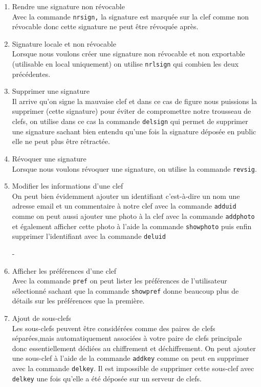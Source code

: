 \begin{enumerate}
\item Rendre une signature non révocable\\
Avec la commande \texttt{nrsign,} la signature est marquée sur la clef comme non révocable donc cette signature ne peut être 
révoquée après.

\item Signature locale et non révocable\\
Lorsque nous voulons créer une signature non révocable et non exportable (utilisable en local uniquement) on utilise \texttt{nrlsign}
 qui combien les deux précédentes.
\item Supprimer une signature\\
Il arrive qu'on signe la mauvaise clef et dans ce cas de figure nous puissions la supprimer (cette signature)  pour éviter de compromettre
 notre trousseau de clefs, on utilise dans ce cas la commande \texttt{delsign} qui permet de supprimer une signature sachant bien
 entendu qu'une fois la signature déposée en public elle ne peut plus être  rétractée.
\item Révoquer une signature\\
Lorsque nous voulons révoquer une signature, on utilise la commande \texttt{revsig}.
\item Modifier les informations d'une clef\\
On peut bien évidemment ajouter un identifiant c'est-à-dire un nom une adresse email et un commentaire à notre clef avec 
la commande \texttt{adduid} comme on peut aussi  ajouter une photo à la clef avec la commande \texttt{addphoto} et également afficher 
cette photo à l'aide la commande \texttt{showphoto} puis enfin supprimer l'identifiant avec la commande \texttt{deluid}

-\item Afficher les préférences d'une clef\\
Avec la commande \texttt{pref} on peut lister les préférences de l'utilisateur sélectionné sachant que la commande \texttt{showpref}
 donne beaucoup plus de détails sur les préférences que la première.
\item Ajout de sous-clefs\\
Les sous-clefs peuvent être considérées comme des paires de clefs séparées,mais automatiquement associées à votre paire de clefs 
principale donc essentiellement dédiées au chiffrement et déchiffrement.
On peut ajouter une sous-clef à l'aide de la commande \texttt{addkey} comme on peut en supprimer avec la commande \texttt{delkey}.
Il est impossible de supprimer cette sous-clef avec \texttt{delkey} une fois qu'elle a été déposée sur un serveur de clefs.


\end{enumerate}
